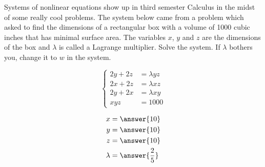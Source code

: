 \documentclass{ximera}
\author{Kenneth Berglund}
\begin{document}
\licenseSZ
\begin{exercise}
Systems of nonlinear equations show up in third semester Calculus in the midst of some really cool problems. The system below came from a problem which asked to find the dimensions of a rectangular box with a volume of 1000 cubic inches that has minimal surface area. The variables $x$, $y$ and $z$ are the dimensions of the box and $\lambda$ is called a Lagrange multiplier. Solve the system. If $\lambda$ bothers you, change it to $w$ in the system.

$$	\begin{cases}
		2y + 2z &= \lambda yz\\
		2x + 2z &= \lambda xz\\
		2y + 2x &= \lambda xy\\
		xyz & = 1000
	\end{cases}	$$

\begin{align*}
x & = \answer{10} \\
y & = \answer{10} \\
z & = \answer{10} \\
\lambda & = \answer{\frac{2}{5}}
\end{align*}

\end{exercise}
\end{document}
